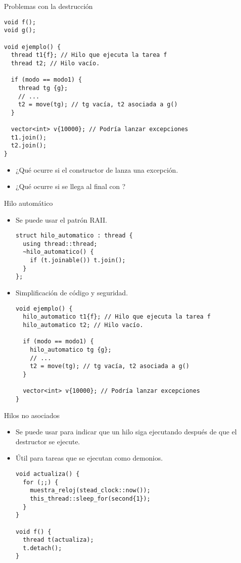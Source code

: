 \begin{frame}[fragile]{Problemas con la destrucción}
\begin{lstlisting}
void f();
void g();

void ejemplo() {
  thread t1{f}; // Hilo que ejecuta la tarea f
  thread t2; // Hilo vacío.

  if (modo == modo1) {
    thread tg {g}; 
    // ...
    t2 = move(tg); // tg vacía, t2 asociada a g()
  }

  vector<int> v{10000}; // Podría lanzar excepciones
  t1.join();
  t2.join();
}
\end{lstlisting}
\begin{itemize}
  \item ¿Qué ocurre si el constructor de  lanza una excepción.
  \item ¿Qué ocurre si se llega al final con ?
\end{itemize}
\end{frame}

\begin{frame}[fragile]{Hilo automático}
\begin{itemize}
  \item Se puede usar el patrón RAII.
\begin{lstlisting}
struct hilo_automatico : thread {
  using thread::thread;
  ~hilo_automatico() { 
    if (t.joinable()) t.join(); 
  }
};
\end{lstlisting}
  \item Simplificación de código y seguridad.
\begin{lstlisting}[basicstyle=\ttfamily\tiny]
void ejemplo() {
  hilo_automatico t1{f}; // Hilo que ejecuta la tarea f
  hilo_automatico t2; // Hilo vacío.

  if (modo == modo1) {
    hilo_automatico tg {g}; 
    // ...
    t2 = move(tg); // tg vacía, t2 asociada a g()
  }

  vector<int> v{10000}; // Podría lanzar excepciones
}
\end{lstlisting}
\end{itemize}
\end{frame}

\begin{frame}[fragile]{Hilos no asociados}
\begin{itemize}
  \item Se puede usar  para indicar que un hilo siga ejecutando 
        después de que el destructor se ejecute.
  \item Útil para tareas que se ejecutan como demonios.
\begin{lstlisting}
void actualiza() {
  for (;;) {
    muestra_reloj(stead_clock::now());
    this_thread::sleep_for(second{1});
  }
}

void f() {
  thread t(actualiza);
  t.detach();
}
\end{lstlisting}
\end{itemize}
\end{frame}

